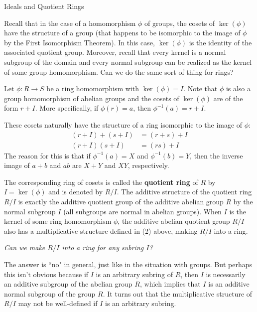 \begin{section}{Ideals and Quotient Rings}

Recall that in the case of a homomorphism $\phi$ of groups, the cosets of $\ker(\phi)$ have the structure of a group (that happens to be isomorphic to the image of $\phi$ by the First Isomorphism Theorem).  In this case, $\ker(\phi)$ is the identity of the associated quotient group.  Moreover, recall that every kernel is a normal subgroup of the domain and every normal subgroup can be realized as the kernel of some group homomorphism.  Can we do the same sort of thing for rings?

Let $\phi:R\to S$ be a ring homomorphism with $\ker(\phi)=I$.  Note that $\phi$ is also a group homomorphism of abelian groups and the cosets of $\ker(\phi)$ are of the form $r+I$.  More specifically, if $\phi(r)=a$, then $\phi^{-1}(a)=r+I$.

These cosets naturally have the structure of a ring isomorphic to the image of $\phi$:
\begin{align}
(r+I)+(s+I) & =  (r+s)+I\\
(r+I)(s+I) & = (rs)+I
\end{align}
The reason for this is that if $\phi^{-1}(a)=X$ and $\phi^{-1}(b)=Y$, then the inverse image of $a+b$ and $ab$ are $X+Y$ and $XY$, respectively.

The corresponding ring of cosets is called the \textbf{quotient ring} of $R$ by $I=\ker(\phi)$ and is denoted by $R/I$.  The additive structure of the quotient ring $R/I$ is exactly the additive quotient group of the additive abelian group $R$ by the normal subgroup $I$ (all subgroups are normal in abelian groups).  When $I$ is the kernel of some ring homomorphism $\phi$, the additive abelian quotient group $R/I$ also has a multiplicative structure defined in (2) above, making $R/I$ into a ring.

\begin{center}
\emph{Can we make $R/I$ into a ring for any subring $I$?}
\end{center}

The answer is ``no" in general, just like in the situation with groups.  But perhaps this isn't obvious because if $I$ is an arbitrary subring of $R$, then $I$ is necessarily an additive subgroup of the abelian group $R$, which implies that $I$ is an additive normal subgroup of the group $R$.  It turns out that the multiplicative structure of $R/I$ may not be well-defined if $I$ is an arbitrary subring.


\end{section}
